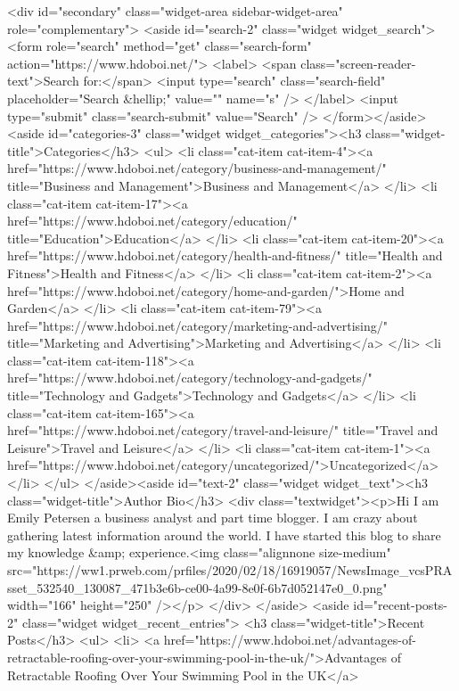	<div id="secondary" class="widget-area sidebar-widget-area" role="complementary">
		<aside id="search-2" class="widget widget_search"><form role="search" method="get" class="search-form" action="https://www.hdoboi.net/">
				<label>
					<span class="screen-reader-text">Search for:</span>
					<input type="search" class="search-field" placeholder="Search &hellip;" value="" name="s" />
				</label>
				<input type="submit" class="search-submit" value="Search" />
			</form></aside><aside id="categories-3" class="widget widget_categories"><h3 class="widget-title">Categories</h3>		<ul>
				<li class="cat-item cat-item-4"><a href="https://www.hdoboi.net/category/business-and-management/" title="Business and Management">Business and Management</a>
</li>
	<li class="cat-item cat-item-17"><a href="https://www.hdoboi.net/category/education/" title="Education">Education</a>
</li>
	<li class="cat-item cat-item-20"><a href="https://www.hdoboi.net/category/health-and-fitness/" title="Health and Fitness">Health and Fitness</a>
</li>
	<li class="cat-item cat-item-2"><a href="https://www.hdoboi.net/category/home-and-garden/">Home and Garden</a>
</li>
	<li class="cat-item cat-item-79"><a href="https://www.hdoboi.net/category/marketing-and-advertising/" title="Marketing and Advertising">Marketing and Advertising</a>
</li>
	<li class="cat-item cat-item-118"><a href="https://www.hdoboi.net/category/technology-and-gadgets/" title="Technology and Gadgets">Technology and Gadgets</a>
</li>
	<li class="cat-item cat-item-165"><a href="https://www.hdoboi.net/category/travel-and-leisure/" title="Travel and Leisure">Travel and Leisure</a>
</li>
	<li class="cat-item cat-item-1"><a href="https://www.hdoboi.net/category/uncategorized/">Uncategorized</a>
</li>
		</ul>
			</aside><aside id="text-2" class="widget widget_text"><h3 class="widget-title">Author Bio</h3>			<div class="textwidget"><p>Hi I am Emily Petersen a business analyst and part time blogger. I am crazy about gathering latest information around the world. I have started this blog to share my knowledge &amp; experience.<img class="alignnone size-medium" src="https://ww1.prweb.com/prfiles/2020/02/18/16919057/NewsImage_vcsPRAsset_532540_130087_471b3e6b-ce00-4a99-8e0f-6b7d052147e0_0.png" width="166" height="250" /></p>
</div>
		</aside>		<aside id="recent-posts-2" class="widget widget_recent_entries">		<h3 class="widget-title">Recent Posts</h3>		<ul>
											<li>
					<a href="https://www.hdoboi.net/advantages-of-retractable-roofing-over-your-swimming-pool-in-the-uk/">Advantages of Retractable Roofing Over Your Swimming Pool in the UK</a>
